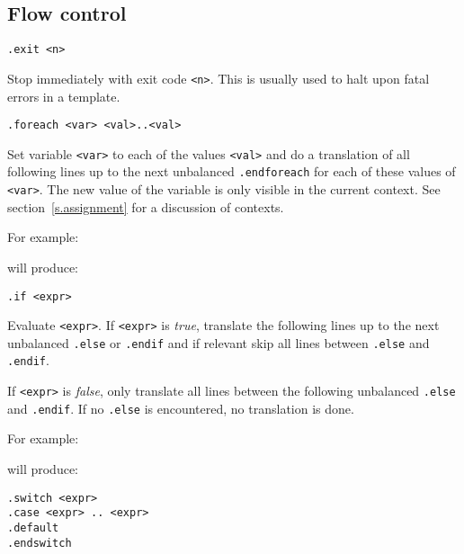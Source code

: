\subsection{Flow control}
\begin{verbatim}
.exit <n>
\end{verbatim}
\begin{desc}
Stop {\Tm} immediately with exit code {\tt <n>}.
This is usually used to halt upon fatal errors in a template.
\end{desc}
\begin{verbatim}
.foreach <var> <val>..<val>
\end{verbatim}
\begin{desc}
Set variable {\tt <var>} to each of the values {\tt <val>} and do a
translation of all following lines up to the next unbalanced
{\tt .endforeach} for each of these values of {\tt <var>}.
The new value of the variable is only visible in the current context.
See section~\ref{s.assignment} for a discussion of contexts.
\par
For example:
\begin{showfile}

\end{showfile}
will produce:
\begin{showfile}

\end{showfile}
\end{desc}
\begin{verbatim}
.if <expr>
\end{verbatim}
\begin{desc}
Evaluate {\tt <expr>}.
If {\tt <expr>} is {\it true},
translate the following lines up to the next unbalanced
{\tt .else} or {\tt .endif}
and if relevant skip all lines between {\tt .else} and {\tt .endif}.

If {\tt <expr>} is {\it false},
only translate all lines between the following unbalanced
{\tt .else} and {\tt .endif}.
If no {\tt .else} is encountered, no translation is done.
\par
For example:
\begin{showfile}

\end{showfile}
will produce:
\begin{showfile}

\end{showfile}
\end{desc}
\begin{verbatim}
.switch <expr>
.case <expr> .. <expr>
.default
.endswitch
\end{verbatim}
